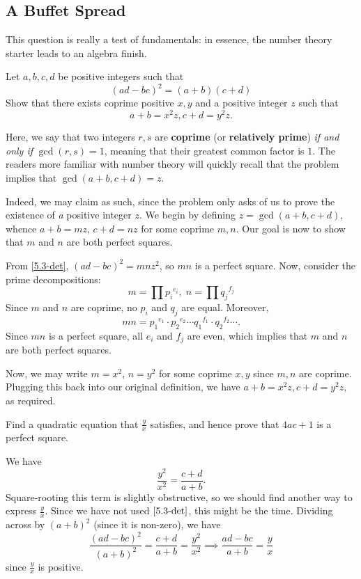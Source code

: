 \documentclass[../main.tex]{subfiles}
\begin{document}
\subsection{A Buffet Spread}
This question is really a test of fundamentals: in essence, the number theory starter leads to an algebra finish.
\begin{example}[2021 H3 Math P1 Q4]
Let $a,b,c,d$ be positive integers such that
\begin{equation}\label{5.3-det}
    (ad-bc)^2=(a+b)(c+d)
\end{equation}
Show that there exists coprime positive $x,y$ and a positive integer $z$ such that
$$a+b=x^2z, c+d=y^2z.$$
\end{example}
Here, we say that two integers $r,s$ are \textbf{coprime} (or \textbf{relatively prime}) \textit{if and only if} $\gcd(r,s)=1$, meaning that their greatest common factor is $1$. The readers more familiar with number theory will quickly recall that the problem implies that $\gcd(a+b, c+d)=z$.

Indeed, we may claim as such, since the problem only asks of us to prove the existence of \textit{a} positive integer $z$. We begin by defining $z=\gcd(a+b, c+d)$, whence $a+b=mz$, $c+d=nz$ for some coprime $m, n$. Our goal is now to show that $m$ and $n$ are both perfect squares.

From \eqref{5.3-det}, $(ad-bc)^2=mnz^2$, so $mn$ is a perfect square. Now, consider the prime decompositions:
    $$m = \prod {p_i}^{e_i}, \;n = \prod {q_j}^{f_j}$$
Since $m$ and $n$ are coprime, no $p_i$ and $q_j$ are equal.
Moreover,
$$mn = {p_1}^{e_1}\cdot{p_2}^{e_2}\cdots{q_1}^{f_1}\cdot{q_2}^{f_2}\cdots.$$
Since $mn$ is a perfect square, all $e_i$ and $f_j$ are even, which implies that $m$ and $n$ are both perfect squares.

Now, we may write $m=x^2$, $n=y^2$ for some coprime $x,y$ since $m, n$ are coprime. Plugging this back into our original definition, we have $a+b=x^2z, c+d=y^2z$, as required.
\newpage
\begin{example}[cont.]
Find a quadratic equation that $\frac{y}{x}$ satisfies, and hence prove that $4ac+1$ is a perfect square.
\end{example}
We have
$$\frac{y^2}{x^2}=\frac{c+d}{a+b}.$$
Square-rooting this term is slightly obstructive, so we should find another way to express $\frac{y}{x}$. Since we have not used $\eqref{5.3-det}$, this might be the time. Dividing across by $(a+b)^2$ (since it is non-zero), we have
$$\frac{(ad-bc)^2}{(a+b)^2}=\frac{c+d}{a+b}=\frac{y^2}{x^2} \implies \frac{ad-bc}{a+b}=\frac{y}{x}$$
since $\frac{y}{x}$ is positive.
\end{document}
